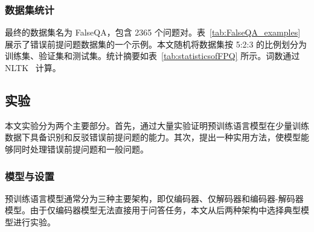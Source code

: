 \subsubsection{数据集统计}
最终的数据集名为 FalseQA，包含 2365 个问题对。表~\ref{tab:FalseQA_examples} 展示了错误前提问题数据集的一个示例。本文随机将数据集按 5:2:3 的比例划分为训练集、验证集和测试集。统计摘要如表~\ref{tab:statisticsofFPQ} 所示。词数通过 NLTK~\cite{bird-loper-2004-nltk} 计算。




\begin{table*}[!htbp]
    \centering
    \caption{示例问题对及其源词、解释/答案}
    \label{tab:FalseQA_examples}
\end{table*}

\subsection{实验}
\label{sec:exp}
本文实验分为两个主要部分。首先，通过大量实验证明预训练语言模型在少量训练数据下具备识别和反驳错误前提问题的能力。其次，提出一种实用方法，使模型能够同时处理错误前提问题和一般问题。

\subsubsection{模型与设置}
预训练语言模型通常分为三种主要架构，即仅编码器、仅解码器和编码器-解码器模型。由于仅编码器模型无法直接用于问答任务，本文从后两种架构中选择典型模型进行实验。

